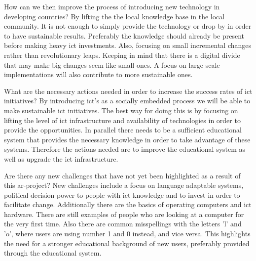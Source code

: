 How can we then improve the process of introducing new technology in developing countries?
By lifting the the local knowledge base in the local community. 
It is not enough to simply provide the technology or drop by in order to have sustainable results.
Preferably the knowledge should already be present before making heavy \gls{ict} investments.
Also, focusing on small incremental changes rather than revolutionary leaps. 
Keeping in mind that there is a digital divide that may make big changes seem like small ones.
A focus on large scale implementations will also contribute to more sustainable ones.

What are the necessary actions needed in order to increase the success rates of \gls{ict} initiatives?
By introducing \gls{ict}'s as a socially embedded process we will be able to make sustainable \gls{ict} initiatives. The best way for doing this is by focusing on lifting the level of \gls{ict} infrastructure and availability of technologies in order to provide the opportunities. In parallel there needs to be a sufficient educational system that provides the necessary knowledge in order to take advantage of these systems. Therefore the actions needed are to improve the educational system as well as upgrade the \gls{ict} infrastructure.

Are there any new challenges that have not yet been highlighted as a result of this \gls{ar}-project?
New challenges include a focus on language adaptable systems, political decision power to people with \gls{ict} knowledge and to invest in order to facilitate change.
Additionally there are the basics of operating computers and \gls{ict} hardware.
There are still examples of people who are looking at a computer for the very first time.
Also there are common misspellings with the letters 'l' and 'o', where users are using number 1 and 0 instead, and vice versa.
This highlights the need for a stronger educational background of new users, preferably provided through the educational system. 
